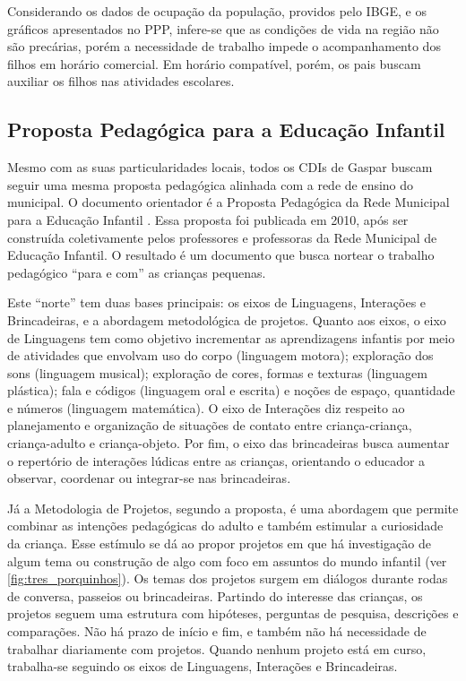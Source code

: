 Considerando os dados de ocupação da população, providos pelo IBGE, e os gráficos apresentados no \ac{PPP}, infere-se que as condições de vida na região não são precárias, porém a necessidade de trabalho impede o acompanhamento dos filhos em horário comercial. Em horário compatível, porém, os pais buscam auxiliar os filhos nas atividades escolares.
 
\subsection{Proposta Pedagógica para a Educação Infantil}
Mesmo com as suas particularidades locais, todos os CDIs de Gaspar buscam seguir uma mesma proposta pedagógica alinhada com a rede de ensino do municipal. O documento orientador é a Proposta Pedagógica da Rede Municipal para a Educação Infantil \cite{gaspar_proposta_2010}. Essa proposta foi publicada em 2010, após ser construída coletivamente pelos professores e professoras da Rede Municipal de Educação Infantil. O resultado é um documento que busca nortear o trabalho pedagógico “para e com” as crianças pequenas.
 
Este “norte” tem duas bases principais: os eixos de Linguagens, Interações e Brincadeiras, e a abordagem metodológica de projetos. Quanto aos eixos, o eixo de Linguagens tem como objetivo incrementar as aprendizagens infantis por meio de atividades que envolvam uso do corpo (linguagem motora); exploração dos sons (linguagem musical); exploração de cores, formas e texturas (linguagem plástica); fala e códigos (linguagem oral e escrita) e noções de espaço, quantidade e números (linguagem matemática). O eixo de Interações diz respeito ao planejamento e organização de situações de contato entre criança-criança, criança-adulto e criança-objeto. Por fim, o eixo das brincadeiras busca aumentar o repertório de interações lúdicas entre as crianças, orientando o educador a observar, coordenar ou integrar-se nas brincadeiras.
 
Já a Metodologia de Projetos, segundo a proposta, é uma abordagem que permite combinar as intenções pedagógicas do adulto e também estimular a curiosidade da criança. Esse estímulo se dá ao propor projetos em que há investigação de algum tema ou construção de algo com foco em assuntos do mundo infantil (ver \autoref{fig:tres_porquinhos}). Os temas dos projetos surgem em diálogos durante rodas de conversa, passeios ou brincadeiras. Partindo do interesse das crianças, os projetos seguem uma estrutura com hipóteses, perguntas de pesquisa, descrições e comparações. Não há prazo de início e fim, e também não há necessidade de trabalhar diariamente com projetos. Quando nenhum projeto está em curso, trabalha-se seguindo os eixos de Linguagens, Interações e Brincadeiras.
 
